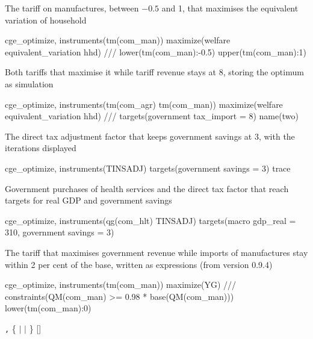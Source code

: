 The tariff on manufactures, between $-0.5$ and 1, that maximises the
equivalent variation of household 
\begin{stcode}
cge_optimize, instruments(tm(com_man)) maximize(welfare equivalent_variation hhd) ///
    lower(tm(com_man):-0.5) upper(tm(com_man):1)
\end{stcode}
Both tariffs that maximise it while tariff revenue stays at 8, storing the
optimum as simulation 
\begin{stcode}
cge_optimize, instruments(tm(com_agr) tm(com_man)) maximize(welfare equivalent_variation hhd) ///
    targets(government tax_import = 8) name(two)
\end{stcode}
The direct tax adjustment factor that keeps government savings at 3, with the
iterations displayed
\begin{stcode}
cge_optimize, instruments(TINSADJ) targets(government savings = 3) trace
\end{stcode}
Government purchases of health services and the direct tax factor that reach
targets for real GDP and government savings
\begin{stcode}
cge_optimize, instruments(qg(com_hlt) TINSADJ) targets(macro gdp_real = 310, government savings = 3)
\end{stcode}
The tariff that maximises government revenue while imports of manufactures
stay within 2 per cent of the base, written as expressions (from version 0.9.4)
\begin{stcode}
cge_optimize, instruments(tm(com_man)) maximize(YG) ///
    constraints(QM(com_man) >= 0.98 * base(QM(com_man))) lower(tm(com_man):0)
\end{stcode}


\begin{stsyntax}
\texttt{,} 
\{ $|$  $|$
\} []
\end{stsyntax}


